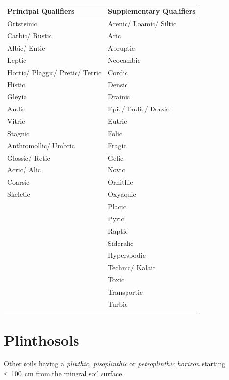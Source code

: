 \documentclass[
  letterpaper,
  DIV=11,
  numbers=noendperiod]{scrreprt}
\begin{document}
\begin{longtable}[]{@{}ll@{}}
\toprule()
Principal Qualifiers & Supplementary Qualifiers \\
\midrule()
\endhead
Ortsteinic & Arenic/ Loamic/ Siltic \\
Carbic/ Rustic & Aric \\
Albic/ Entic & Abruptic \\
Leptic & Neocambic \\
Hortic/ Plaggic/ Pretic/ Terric & Cordic \\
Histic & Densic \\
Gleyic & Drainic \\
Andic & Epic/ Endic/ Dorsic \\
Vitric & Eutric \\
Stagnic & Folic \\
Anthromollic/ Umbric & Fragic \\
Glossic/ Retic & Gelic \\
Acric/ Alic & Novic \\
Coarsic & Ornithic \\
Skeletic & Oxyaquic \\
& Placic \\
& Pyric \\
& Raptic \\
& Sideralic \\
& Hyperspodic \\
& Technic/ Kalaic \\
& Toxic \\
& Transportic \\
& Turbic \\
\bottomrule()
\end{longtable}


\hypertarget{key-plinthosols}{%
\chapter{Plinthosols}\label{key-plinthosols}}

Other soils having a \emph{plinthic}, \emph{pisoplinthic} or
\emph{petroplinthic horizon} starting ≤~100~cm from the mineral soil
surface.
\end{document}
